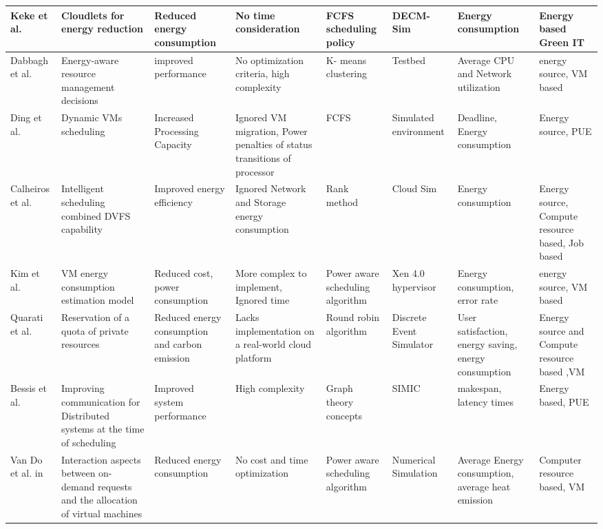 \begin{table*}[!htbp]
{\begin{tabular}{|p{1.5cm} p{2cm} p{2cm} p{2cm} p{2cm} p{2cm} p{2cm} p{2cm}|}
Keke et al.~\cite{gai2016dynamic} & Cloudlets for energy reduction & Reduced energy consumption & No time consideration & FCFS scheduling policy & DECM-Sim & Energy consumption & Energy based Green IT
\\ \hline

 

Dabbagh et al.~\cite{dabbagh2015energy} &  Energy-aware resource management decisions  & improved performance & No optimization criteria, high complexity& K- means clustering& Testbed & Average CPU and Network utilization & energy source, VM based
\\ \hline

Ding  et al.~\cite{ding2015energy} & Dynamic VMs scheduling & Increased Processing Capacity & Ignored VM migration, Power penalties of status transitions of processor & FCFS & Simulated environment  & Deadline, Energy consumption & Energy source, PUE
\\ \hline 

Calheiros et al.~\cite{calheiros2014energy} & Intelligent scheduling combined DVFS capability  &  Improved energy efficiency  & Ignored Network and Storage energy consumption  &  Rank method   & Cloud Sim & Energy consumption & Energy source, Compute resource based, Job based
\\ \hline 

Kim et al.~\cite{kim2014energy} & VM energy consumption estimation model & Reduced cost, power consumption & More complex to implement, Ignored time & Power aware scheduling algorithm & Xen 4.0 hypervisor & Energy consumption, error rate & energy source, VM based
\\ \hline

Quarati et al.~\cite{quarati2013hybrid} &  Reservation of a quota of private resources & Reduced energy consumption and carbon emission & Lacks implementation on a real-world cloud platform & Round robin algorithm & Discrete Event Simulator & User satisfaction, energy saving, energy consumption & Energy source and  Compute resource based ,VM 
\\ \hline

Bessis et al.~\cite{bessis2013using} & Improving communication for Distributed systems at the time of scheduling & Improved system performance & High complexity & Graph theory concepts & SIMIC & makespan, latency times & Energy based, PUE
\\ \hline 

Van Do et al. in~\cite{van2012comparison} & Interaction aspects between on-demand requests and the allocation of virtual machines & Reduced energy consumption & No cost and time optimization & Power aware scheduling algorithm & Numerical Simulation & Average Energy consumption, average heat emission & Computer resource based, VM
\\ \hline


\end{tabular}}
\end{table*}
